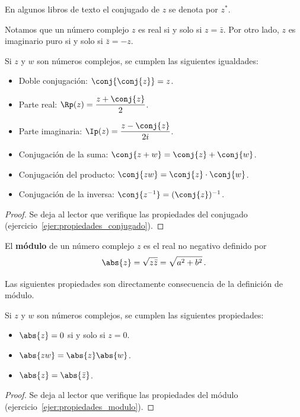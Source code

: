 \begin{nota}
  En algunos libros de texto el conjugado de $z$ se denota por $z^*$.
\end{nota}

Notamos que un número complejo $z$ es real si y solo si $z = \bar z$. Por otro lado, $z$ es imaginario puro si y solo si $\bar z = -z$.

\begin{prop}
  \label{prop:propiedades_conjugado}
  Si $z$ y $w$ son números complejos, se cumplen las siguientes igualdades:
  \begin{itemize}
    \item Doble conjugación: $\conj{\conj{z}} = z$.
    \item Parte real: $\Rp(z) = \dfrac{z + \conj{z}}{2}$.
    \item Parte imaginaria: $\Ip(z) = \dfrac{z - \conj{z}}{2i}$.
    \item Conjugación de la suma: $\conj{z + w} = \conj{z} + \conj{w}$.
    \item Conjugación del producto: $\conj{zw} = \conj{z} \cdot \conj{w}$.
    \item Conjugación de la inversa: $\conj{z^{-1}} = (\conj{z})^{-1}$.
  \end{itemize}
\end{prop}
\begin{proof}
  Se deja al lector que verifique las propiedades del conjugado (ejercicio~\ref{ejer:propiedades_conjugado}).
\end{proof}

\begin{defi}[Módulo]
  El \textbf{módulo} de un número complejo $z$ es el real no negativo definido por
  \[ \abs{z} = \sqrt{z\bar z} = \sqrt{a^2 + b^2}\,. \]
\end{defi}

Las siguientes propiedades son directamente consecuencia de la definición de módulo.

\begin{prop}
  \label{prop:propiedades_modulo}
  Si $z$ y $w$ son números complejos, se cumplen las siguientes propiedades:
  \begin{itemize}
    \item $\abs{z} = 0$ si y solo si $z = 0$.
    \item $\abs{zw} = \abs{z}\abs{w}$.
    \item $\abs{z} = \abs{\bar{z}}$.
  \end{itemize}
\end{prop}
\begin{proof}
  Se deja al lector que verifique las propiedades del módulo (ejercicio~\ref{ejer:propiedades_modulo}).
\end{proof}

